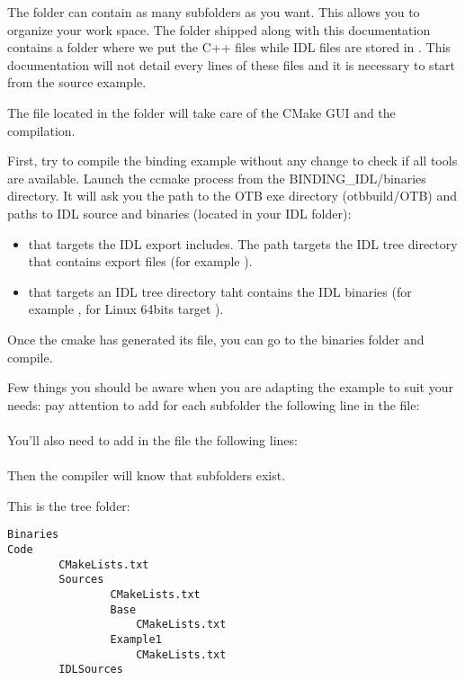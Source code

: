 The  folder can contain as many subfolders as you want. This allows you to organize your work space. The  folder shipped along with this 
documentation contains a  folder where we put the C++ files while IDL files are stored in . This documentation will not detail every lines of these files and it is necessary to start from the source example.

The  file located in the  folder will take care of the CMake GUI and the compilation.

First, try to compile the binding example without any change to check if all tools are available. Launch the ccmake process from the BINDING\_IDL/binaries directory. It will ask you the path to the OTB exe directory 
(\/otb\-build/OTB) and paths to IDL source and binaries (located in your IDL folder):

\begin{itemize}
\item {} that targets the IDL export includes. The path targets the IDL tree directory that contains export files (for example ).
\item {} that targets an IDL tree directory taht contains the IDL binaries (for example , for Linux 64bits target  ).
\end{itemize}

Once the cmake has generated its file, you can go to the binaries folder and compile.

Few things you should be aware when you are adapting the example to suit your needs: pay attention to add for each subfolder the following line in the  file:\\
\\
You'll also need to add in the  file the following lines:
\\
\\


Then the compiler will know that subfolders exist.
 
This is the tree folder:
\begin{verbatim}
Binaries
Code
        CMakeLists.txt
        Sources
                CMakeLists.txt
                Base
                    CMakeLists.txt
                Example1
                    CMakeLists.txt
        IDLSources
\end{verbatim}
 
